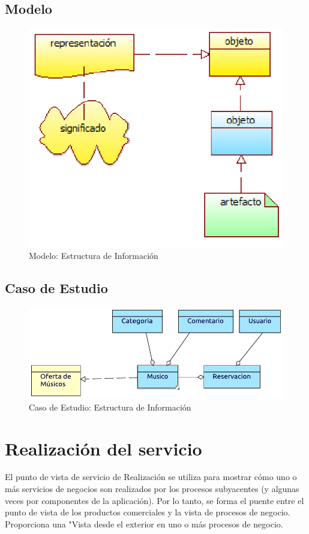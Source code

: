 \subsection{Modelo}
\begin{figure}[h!]
	\centering
	\includegraphics[width=0.8\linewidth]{Arquitectura/Tecnologia/imgs/estructuraMetamodelo.PNG}
	\caption{Modelo: Estructura de Información}
\end{figure}
\newpage
\subsection{Caso de Estudio}

\begin{figure}[h!]
	\centering
	\includegraphics[width=\linewidth]{Arquitectura/Tecnologia/imgs/estructura.pdf}
	\caption{Caso de Estudio: Estructura de Información}
\end{figure}

\newpage

\section{Realización del servicio}
El punto de vista de servicio de Realización se utiliza para mostrar cómo uno o más servicios de negocios son realizados por los procesos subyacentes (y algunas veces por componentes de la aplicación). Por lo tanto, se forma el puente entre el punto de vista de los productos comerciales y la vista de procesos de negocio. Proporciona una "Vista desde el exterior en uno o más procesos de negocio. \cite{ArchiMat55:online} \vspace{\baselineskip}

